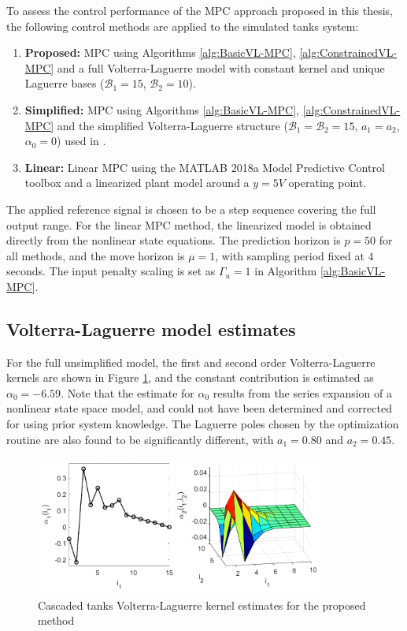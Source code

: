 To assess the control performance of the MPC approach proposed in this thesis, the following control methods are applied to the simulated tanks system:
\begin{enumerate}
\item \textbf{Proposed:} MPC using Algorithms \ref{alg:BasicVL-MPC}, \ref{alg:ConstrainedVL-MPC} and a full Volterra-Laguerre model with constant kernel and unique Laguerre bases ($\mathcal{B}_1 = 15$, $\mathcal{B}_2=10$). 
\item \textbf{Simplified:} MPC using Algorithms \ref{alg:BasicVL-MPC}, \ref{alg:ConstrainedVL-MPC} and the simplified Volterra-Laguerre structure ($\mathcal{B}_1 = \mathcal{B}_2 = 15$, $a_1=a_2$, $\alpha_0=0$) used in \cite{Parker1998}. 
\item \textbf{Linear:} Linear MPC using the MATLAB 2018a Model Predictive Control toolbox and a linearized plant model around a $y=5V$ operating point.
\end{enumerate}
The applied reference signal is chosen to be a step sequence covering the full output range. For the linear MPC method, the linearized model is obtained directly from the nonlinear state equations. The prediction horizon is $p=50$ for all methods, and the move horizon is $\mu=1$, with sampling period fixed at $4$ seconds. The input penalty scaling is set as $\Gamma_u = 1$ in Algorithm \ref{alg:BasicVL-MPC}.

\subsection{Volterra-Laguerre model estimates}

For the full unsimplified model, the first and second order Volterra-Laguerre kernels are shown in Figure \ref{fig:ProposedKernels_MPC}, and the constant contribution is estimated as $\alpha_0 = -6.59$. Note that the estimate for $\alpha_0$ results from the series expansion of a nonlinear state space model, and could not have been determined and corrected for using prior system knowledge. The Laguerre poles chosen by the optimization routine are also found to be significantly different, with $a_1 = 0.80$ and $a_2 = 0.45$.

\begin{figure}[h]
\centering
\includegraphics[width=0.85\textwidth]{Chapter11_ControlStudy/Alternate0_kernels_coloured.pdf}
\caption{Cascaded tanks Volterra-Laguerre kernel estimates for the proposed method}
\label{fig:ProposedKernels_MPC}
\end{figure}

